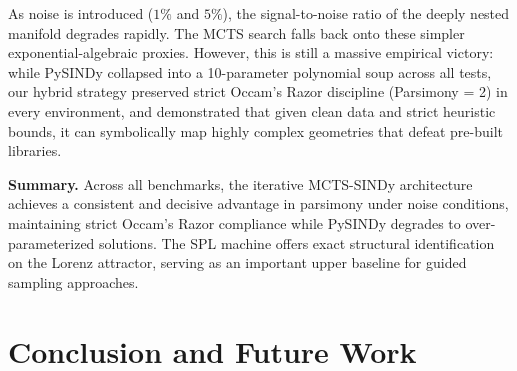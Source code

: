 \documentclass[11pt, a4paper]{article}
\begin{document}
As noise is introduced ($1\%$ and $5\%$), the signal-to-noise ratio of the deeply nested manifold degrades rapidly. The MCTS search falls back onto these simpler exponential-algebraic proxies. However, this is still a massive empirical victory: while PySINDy collapsed into a 10-parameter polynomial soup across all tests, our hybrid strategy preserved strict Occam's Razor discipline (Parsimony = 2) in every environment, and demonstrated that given clean data and strict heuristic bounds, it can symbolically map highly complex geometries that defeat pre-built libraries.

\vspace{0.3cm}
\noindent\textbf{Summary.} Across all benchmarks, the iterative MCTS-SINDy architecture achieves a consistent and decisive advantage in parsimony under noise conditions, maintaining strict Occam's Razor compliance while PySINDy degrades to over-parameterized solutions. The SPL machine offers exact structural identification on the Lorenz attractor, serving as an important upper baseline for guided sampling approaches.

\section{Conclusion and Future Work}


\newpage


\end{document}
